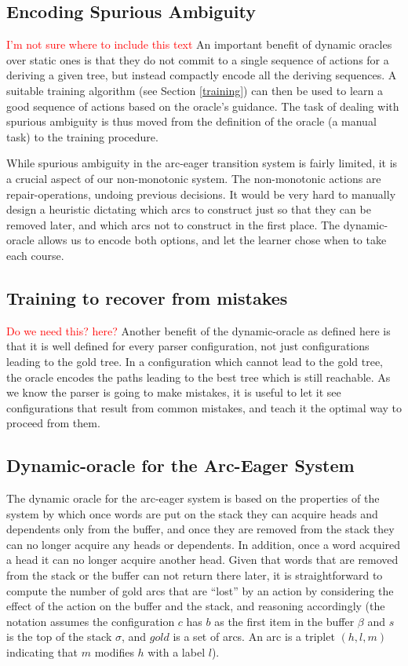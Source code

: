 \documentclass[11pt,letterpaper]{article}
\newcommand{\note}[1]{\textcolor{red}{#1}}
\begin{document}
\subsection{Encoding Spurious Ambiguity}
\note{I'm not sure where to include this text}
An important benefit of dynamic oracles over static ones is that they do not
commit to a single sequence of actions for a deriving a given tree, but instead
compactly encode all the deriving sequences. A suitable training algorithm
(see Section \ref{training}) can then be used to learn a good sequence of
actions based on the oracle's guidance.  The task of dealing with spurious
ambiguity is thus moved from the definition of the oracle (a manual task) to
the training procedure.

While spurious ambiguity in the arc-eager transition system is fairly limited, 
it is a crucial aspect of our non-monotonic system.  The non-monotonic
actions are repair-operations, undoing previous decisions.  It would be very
hard to manually design a heuristic dictating which arcs to construct just so
that they can be removed later, and which arcs not to construct in the first
place.  The dynamic-oracle allows us to encode both options, and let the
learner chose when to take each course. 

\subsection{Training to recover from mistakes}
\note{Do we need this? here?}
Another benefit of the dynamic-oracle as defined here is that it is well
defined for every parser configuration, not just configurations leading to the
gold tree.  In a configuration which cannot lead to the gold tree, the oracle
encodes the paths leading to the best tree which is still reachable.  As we
know the parser is going to make mistakes, it is useful to let it see
configurations that result from common mistakes, and teach it the optimal way
to proceed from them.


\subsection{Dynamic-oracle for the Arc-Eager System}

The dynamic oracle for the arc-eager system is based on the properties of the
system by which once words are put on the stack they can acquire heads and
dependents only from the buffer, and once they are removed from the stack they
can no longer acquire any heads or dependents. In addition, once a word
acquired a head it can no longer acquire another head.  Given that words that
are removed from the stack or the buffer can not return there later, it
is straightforward to compute the number of gold arcs that are ``lost'' by an
action by considering the effect of the action on the buffer and the stack,
and reasoning accordingly (the notation assumes the configuration $c$ has $b$
as the first item in the buffer $\beta$ and $s$ is the top of the stack
$\sigma$, and $gold$ is a set of arcs. An arc is a triplet $(h,l,m)$
indicating that $m$ modifies $h$ with a label $l$).
\end{document}
